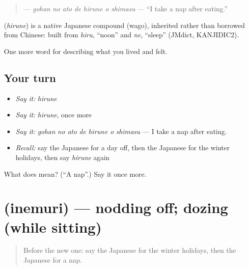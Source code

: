 \begin{quote}
\textbf{   } — \emph{gohan no ato de hirune o shimasu} — \textquotedblleft{}I take a nap after eating.\textquotedblright{}
\end{quote}

\begin{cousinweb}
\textbf{} (\emph{hirune}) is a native Japanese compound (wago), inherited rather than borrowed from Chinese: built from \emph{hiru}, \textquotedblleft{}noon\textquotedblright{} and \emph{ne}, \textquotedblleft{}sleep\textquotedblright{} (JMdict, KANJIDIC2).
\end{cousinweb}

\begin{grammarlens}[title={What you've built}]
One more word for describing what you lived and felt.
\end{grammarlens}

\subsection*{Your turn}
\begin{itemize}
\raggedright
  \item \emph{Say it:} \emph{hirune}
  \item \emph{Say it:} \emph{hirune}, once more
  \item \emph{Say it:} \emph{gohan no ato de hirune o shimasu} — I take a nap after eating.
  \item \emph{Recall:} say the Japanese for a day off, then the Japanese for the winter holidays, then say \emph{hirune} again
\end{itemize}

\begin{tcolorbox}[breakable,colback=teal!4,colframe=teal!35!black,title={Before you move on}]
What does  mean? (\textquotedblleft{}A nap\textquotedblright{}.) Say it once more.
\end{tcolorbox}
\section[\texorpdfstring{\ja{いねむり} (inemuri)}{いねむり (inemuri)}]{ (inemuri) — nodding off; dozing (while sitting)}

\label{lesson:JA-C498-inemuri}



\begin{quote}
Before the new one: say the Japanese for the winter holidays, then the Japanese for a nap.
\end{quote}

